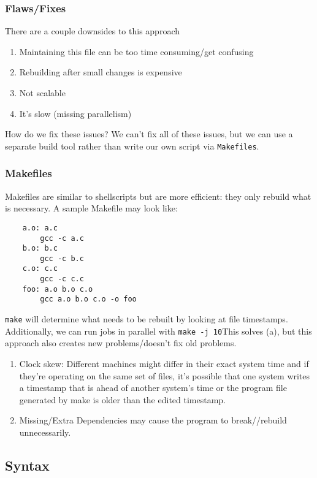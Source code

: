 \documentclass[13pt]{article}
\begin{document}
\subsubsection{Flaws/Fixes}
There are a couple downsides to this approach
\begin{enumerate}[label=(\alph*)]
\item  Maintaining this file can be too time consuming/get confusing
\item Rebuilding after small changes is expensive
\item Not scalable
\item It's slow (missing parallelism)
\end{enumerate}
How do we fix these issues? We can't fix all of these issues, but we can use a separate build tool rather than write our own script via \texttt{Makefiles}.

\subsubsection{Makefiles}
Makefiles are similar to shellscripts but are more efficient: they only rebuild what is necessary. A sample Makefile may look like:
\begin{verbatim}
    a.o: a.c
        gcc -c a.c
    b.o: b.c
        gcc -c b.c
    c.o: c.c
        gcc -c c.c
    foo: a.o b.o c.o
        gcc a.o b.o c.o -o foo
\end{verbatim}
\texttt{make} will determine what needs to be rebuilt by looking at file timestamps. Additionally, we can run jobs in parallel with \texttt{make -j 10}This solves (a), but this approach also creates new problems/doesn't fix old problems.

\begin{enumerate}[label=(\roman*)]
\item Clock skew: Different machines might differ in their exact system time and if they’re operating on the same set of files, it's possible that one system writes a timestamp that is ahead of another system’s time or the program file generated by make is older than the edited timestamp.
\item Missing/Extra Dependencies may cause the program to break//rebuild unnecessarily.
\end{enumerate}





\subsection{Syntax}
\end{document}
